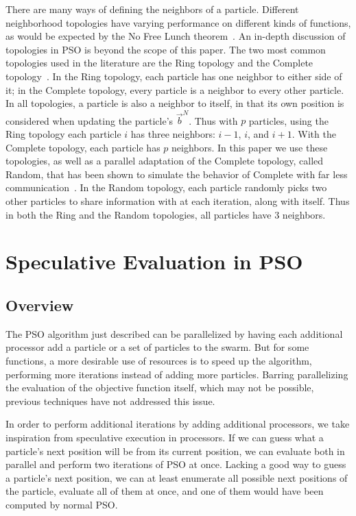 \documentclass[journal,letterpaper]{IEEEtran}
\providecommand{\neigh}{\ensuremath{N}}
\providecommand{\nbest}{\ensuremath{\Vec{b}^\neigh}}
\begin{document}
There are many ways of defining the neighbors of a particle.  Different
neighborhood topologies have varying performance on different kinds of
functions, as would be expected by the No Free Lunch
theorem~\cite{wolpert-tec97}.  An in-depth discussion of topologies in PSO is
beyond the scope of this paper.  The two most common topologies used in the
literature are the Ring topology and the Complete
topology~\cite{bratton-sis07}.  In the Ring topology, each particle has one
neighbor to either side of it; in the Complete topology, every particle is a
neighbor to every other particle.  In all topologies, a particle is also a
neighbor to itself, in that its own position is considered when updating the
particle's $\nbest$.  Thus with $p$ particles, using the Ring topology each
particle $i$ has three neighbors: $i-1$, $i$, and $i+1$.  With the Complete
topology, each particle has $p$ neighbors.  In this paper we use these
topologies, as well as a parallel adaptation of the Complete topology, called
Random, that has been shown to simulate the behavior of Complete with far less
communication~\cite{mcnabb-cec09}.  In the Random topology, each particle
randomly picks two other particles to share information with at each iteration,
along with itself.  Thus in both the Ring and the Random topologies, all
particles have 3 neighbors.

\section{Speculative Evaluation in PSO}
\label{sec:sepso}
\subsection{Overview}

The PSO algorithm just described can be parallelized by having each additional
processor add a particle or a set of particles to the swarm.  But for some
functions, a more desirable use of resources is to speed up the algorithm,
performing more iterations instead of adding more particles.  Barring
parallelizing the evaluation of the objective function itself, which may not be
possible, previous techniques have not addressed this issue.

In order to perform additional iterations by adding additional processors, we
take inspiration from speculative execution in processors.  If we can guess
what a particle's next position will be from its current position, we can
evaluate both in parallel and perform two iterations of PSO at once.  Lacking
a good way to guess a particle's next position, we can at least enumerate all
possible next positions of the particle, evaluate all of them at once, and one
of them would have been computed by normal PSO.
\end{document}
